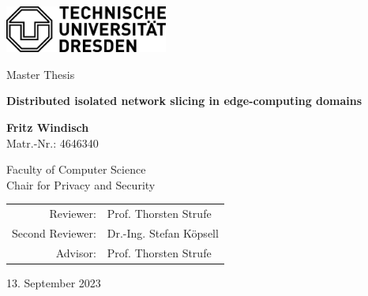 \begin{titlepage}
    \includegraphics[width=0.4\textwidth]{images/title/tud.png}
    \begin{center}
        \vspace*{2.5cm}

        Master Thesis

        \vspace{1cm}

        \textbf{\huge Distributed isolated network slicing in edge-computing domains}

        \vspace{1.5cm}

        \textbf{\large Fritz Windisch}\\
        Matr.-Nr.: 4646340

        \vspace{1cm}

        Faculty of Computer Science\\
        Chair for Privacy and Security

        \vfill

        \begin{tabular}{rl}
               Reviewer: & Prof. Thorsten Strufe \\
               Second Reviewer: & Dr.-Ing. Stefan Köpsell \\
               Advisor: & Prof. Thorsten Strufe \\
        \end{tabular}

        \vspace{0.8cm}

        13. September 2023

   \end{center}
\end{titlepage}
